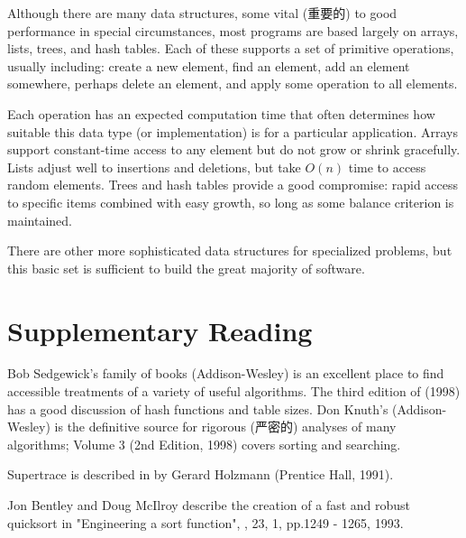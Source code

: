 Although there are many data structures, some vital (重要的) to good
performance in special circumstances, most programs are based largely on
arrays, lists, trees, and hash tables. Each of these supports a set of
primitive operations, usually including: create a new element, find an
element, add an element somewhere, perhaps delete an element, and apply
some operation to all elements.

Each operation has an expected computation time that often determines how
suitable this data type (or implementation) is for a particular
application. Arrays support constant-time access to any element but do not
grow or shrink gracefully. Lists adjust well to insertions and deletions,
but take $O(n)$ time to access random elements. Trees and hash tables
provide a good compromise: rapid access to specific items combined with
easy growth, so long as some balance criterion is maintained.

There are other more sophisticated data structures for specialized
problems, but this basic set is sufficient to build the great majority of
software.

\section*{Supplementary Reading}

Bob Sedgewick's family of  books (Addison-Wesley) is
an excellent place to find accessible treatments of a variety of useful
algorithms. The third edition of  (1998) has a
good discussion of hash functions and table sizes. Don Knuth's
 (Addison-Wesley) is the
definitive source for rigorous (严密的) analyses of many algorithms; Volume
3 (2nd Edition, 1998) covers sorting and searching.

Supertrace is described in  by Gerard Holzmann (Prentice Hall, 1991).

Jon Bentley and Doug McIlroy describe the creation of a fast and robust
quicksort in "Engineering a sort function", , 23, 1, pp.1249 - 1265, 1993.
